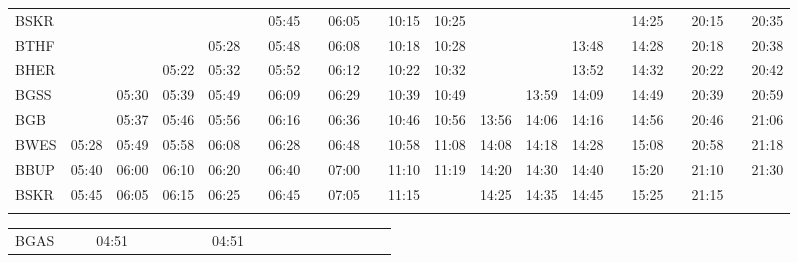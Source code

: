 \begin{center}
\begin{tabular}
\begin{tabular}
\begin{tabular}{!{\color{lightbrown}\vrule width 3pt}l!{\color{lightbrown}\vrule width 3pt}*{19}{c|}c!{\color{lightbrown}\vrule width 3pt}}
\hline
{}
 \\
\hline
BSKR     &
      &       &       &       &          & 05:45 &          & 06:05 &  & 10:15 & 10:25 &       &       &       &          & 14:25 &  & 20:15 &  & 20:35 \\
BTHF     &
      &       &       & 05:28 &  & 05:48 &  & 06:08 & \lbr{}   & 10:18 & 10:28 &       &       & 13:48 &  & 14:28 & \lbr{}   & 20:18 & \lbr{}   & 20:38 \\
BHER     &
      &       & 05:22 & 05:32 & \lbr{}   & 05:52 & \lbr{}   & 06:12 & \lbr{}   & 10:22 & 10:32 &       &       & 13:52 & \lbr{}   & 14:32 & \lbr{}   & 20:22 & \lbr{}   & 20:42 \\
BGSS     &
      & 05:30 & 05:39 & 05:49 & \lbr{}   & 06:09 & \lbr{}   & 06:29 & \lbr{}   & 10:39 & 10:49 &       & 13:59 & 14:09 & \lbr{}   & 14:49 & \lbr{}   & 20:39 & \lbr{}   & 20:59 \\
BGB      &
      & 05:37 & 05:46 & 05:56 & \lbr{}   & 06:16 & \lbr{}   & 06:36 & \lbr{}   & 10:46 & 10:56 & 13:56 & 14:06 & 14:16 & \lbr{}   & 14:56 & \lbr{}   & 20:46 & \lbr{}   & 21:06 \\
BWES     &
05:28 & 05:49 & 05:58 & 06:08 & \lbr{}   & 06:28 & \lbr{}   & 06:48 & \lbr{}   & 10:58 & 11:08 & 14:08 & 14:18 & 14:28 & \lbr{}   & 15:08 & \lbr{}   & 20:58 & \lbr{}   & 21:18 \\
BBUP     &
05:40 & 06:00 & 06:10 & 06:20 & \lbr{}   & 06:40 & \lbr{}   & 07:00 & \lbr{}   & 11:10 & 11:19 & 14:20 & 14:30 & 14:40 & \lbr{}   & 15:20 & \lbr{}   & 21:10 & \lbr{}   & 21:30 \\
BSKR     &
05:45 & 06:05 & 06:15 & 06:25 & \lbr{}   & 06:45 & \lbr{}   & 07:05 & \lbr{}   & 11:15 &       & 14:25 & 14:35 & 14:45 & \lbr{}   & 15:25 & \lbr{}   & 21:15 &          &       \\
\myhline
\end{tabular}
\fi
\fi
\ifulrich
\begin{tabular}{!{\color{mbrown}\vrule width 3pt}l!{\color{mbrown}\vrule width 3pt}*{5}{c|}c!{\color{mbrown}\vrule width 3pt}
*{6}{c|}c!{\color{mbrown}\vrule width 3pt}*{5}{c|}c!{\color{mbrown}\vrule width 3pt}}
\hline
{}
 &  &  \\
\hline
BGAS     &
      &       & 04:51 &       &          &       &
      &       & 04:51 &       &       &          &       &

\end{tabular}
\end{tabular}
\end{tabular}
\end{center}
